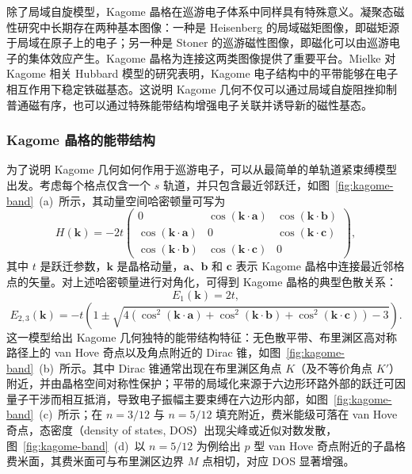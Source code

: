 除了局域自旋模型，Kagome 晶格在巡游电子体系中同样具有特殊意义。凝聚态磁性研究中长期存在两种基本图像：一种是 Heisenberg 的局域磁矩图像，即磁矩源于局域在原子上的电子\cite{Heisenberg1928Ferromagnetismus}；另一种是 Stoner 的巡游磁性图像，即磁化可以由巡游电子的集体效应产生\cite{Stoner1938CollectiveElectronFerromagnetism}。Kagome 晶格为连接这两类图像提供了重要平台。Mielke 对 Kagome 相关 Hubbard 模型的研究表明，Kagome 电子结构中的平带能够在电子相互作用下稳定铁磁基态\cite{Mielke1991LineGraphs}。这说明 Kagome 几何不仅可以通过局域自旋阻挫抑制普通磁有序，也可以通过特殊能带结构增强电子关联并诱导新的磁性基态。

\subsubsection{Kagome 晶格的能带结构}
为了说明 Kagome 几何如何作用于巡游电子，可以从最简单的单轨道紧束缚模型出发。考虑每个格点仅含一个 $s$ 轨道，并只包含最近邻跃迁，如图~\ref{fig:kagome-band}~(a)~所示，其动量空间哈密顿量可写为
\begin{equation}
H(\mathbf{k}) = -2t 
\begin{pmatrix}
0 & \cos(\mathbf{k} \cdot \mathbf{a}) & \cos(\mathbf{k} \cdot \mathbf{b}) \\
\cos(\mathbf{k} \cdot \mathbf{a}) & 0 & \cos(\mathbf{k} \cdot \mathbf{c}) \\
\cos(\mathbf{k} \cdot \mathbf{b}) & \cos(\mathbf{k} \cdot \mathbf{c}) & 0
\end{pmatrix},
\end{equation}
其中 $t$ 是跃迁参数，$\mathbf{k}$ 是晶格动量，$\mathbf{a}$、$\mathbf{b}$ 和 $\mathbf{c}$ 表示 Kagome 晶格中连接最近邻格点的矢量。对上述哈密顿量进行对角化，可得到 Kagome 晶格的典型色散关系：
\begin{equation}
E_1(\mathbf{k}) = 2t,
\label{eq:E1-flat}
\end{equation}
\begin{equation}
E_{2,3}(\mathbf{k}) = -t \left( 1 \pm \sqrt{4\left( \cos^2(\mathbf{k} \cdot \mathbf{a}) + \cos^2(\mathbf{k} \cdot \mathbf{b}) + \cos^2(\mathbf{k} \cdot \mathbf{c}) \right) - 3} \right).
\label{eq:E23-disp}
\end{equation}
这一模型给出 Kagome 几何独特的能带结构特征：无色散平带、布里渊区高对称路径上的 van Hove 奇点以及角点附近的 Dirac 锥，如图~\ref{fig:kagome-band}~(b)~所示。其中 Dirac 锥通常出现在布里渊区角点 $K$（及不等价角点 $K'$）附近，并由晶格空间对称性保护；平带的局域化来源于六边形环路外部的跃迁可因量子干涉而相互抵消，导致电子振幅主要束缚在六边形内部，如图~\ref{fig:kagome-band}~(c)~所示；在 $n=3/12$ 与 $n=5/12$ 填充附近，费米能级可落在 van Hove 奇点，态密度（density of states, DOS）出现尖峰或近似对数发散，图~\ref{fig:kagome-band}~(d)~以 $n=5/12$ 为例给出 $p$ 型 van Hove 奇点附近的子晶格费米面，其费米面可与布里渊区边界 $M$ 点相切，对应 DOS 显著增强。
